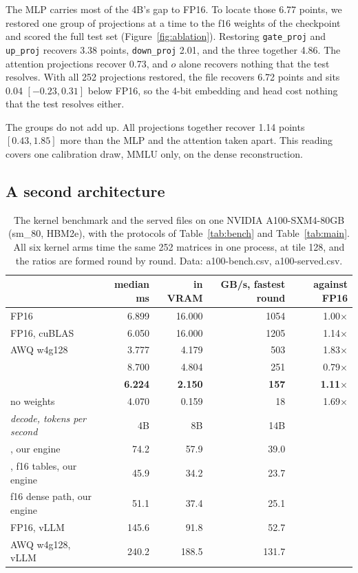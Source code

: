 The MLP carries most of the 4B's gap to FP16. To locate those 6.77 points, we
restored one group of projections at a time to the f16 weights of the
checkpoint and scored the full test set (Figure~\ref{fig:ablation}). Restoring
\texttt{gate\_proj} and \texttt{up\_proj} recovers 3.38 points,
\texttt{down\_proj} 2.01, and the three together 4.86. The attention
projections recover 0.73, and $o$ alone recovers nothing that the test
resolves. With all 252 projections restored, the file recovers 6.72 points and
sits 0.04 $[-0.23, 0.31]$ below FP16, so the 4-bit embedding and head cost
nothing that the test resolves either.

The groups do not add up. All projections together recover 1.14 points
$[0.43, 1.85]$ more than the MLP and the attention taken apart. This reading
covers one calibration draw, MMLU only, on the dense reconstruction.

\subsection{A second architecture}
\label{sec:a100}

\begin{table}[t]
\centering\small\setlength{\tabcolsep}{5pt}
\caption{The kernel benchmark and the served files on one NVIDIA
A100-SXM4-80GB (sm\_80, HBM2e), with the protocols of Table~\ref{tab:bench}
and Table~\ref{tab:main}. All six kernel arms time the same 252 matrices in
one process, at tile 128, and the ratios are formed round by round. Data:
a100-bench.csv, a100-served.csv.}
\label{tab:a100}
\begin{tabular}{lrrrr}
\toprule
 & median ms & \bw{} in VRAM & GB/s, fastest round & against FP16\\
\midrule
FP16 & 6.899 & 16.000 & 1054 & 1.00$\times$\\
FP16, cuBLAS & 6.050 & 16.000 & 1205 & 1.14$\times$\\
AWQ w4g128 & 3.777 & 4.179 & 503 & 1.83$\times$\\
\Planes{} & 8.700 & 4.804 & 251 & 0.79$\times$\\
\textbf{\Tetra{}} & \textbf{6.224} & \textbf{2.150} & \textbf{157} & \textbf{1.11$\times$}\\
no weights & 4.070 & 0.159 & 18 & 1.69$\times$\\
\midrule
\textit{decode, tokens per second} & 4B & 8B & 14B & \\
\Tetra{}, our engine & 74.2 & 57.9 & 39.0 & \\
\Tetra{}, f16 tables, our engine & 45.9 & 34.2 & 23.7 & \\
f16 dense path, our engine & 51.1 & 37.4 & 25.1 & \\
FP16, vLLM & 145.6 & 91.8 & 52.7 & \\
AWQ w4g128, vLLM & 240.2 & 188.5 & 131.7 & \\
\bottomrule
\end{tabular}
\end{table}

